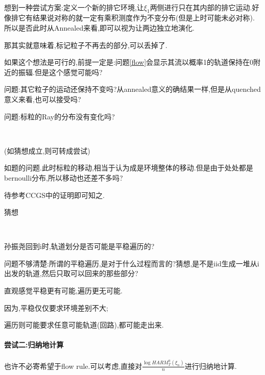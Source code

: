 \documentclass[a4paper,oneside]{ctexbook}
\begin{document}
					\begin{tri}[拆成两部分不相关的排它环境]
						\label{separate}
						\ 

						想到一种尝试方案:定义一个新的排它环境,让$\xi_1$两侧进行只在其内部的排它运动.好像排它有结果说对称的就一定有乘积测度作为不变分布(但是上时可能未必对称).所以是否此时从Annealed来看,即可以视为让两边独立地演化.

						那其实就意味着,标记粒子不再去的部分,可以丢掉了.

						如果这个想法是可行的,前提一定是:问题\ref{flow}会显示其流以概率1的轨道保持在0附近的振辐.但是这个感觉可能吗?

						问题:其它粒子的运动还保持不变吗?从annealed意义的确结果一样,但是从quenched意义来看,也可以接受吗?

						问题:标粒的Ray的分布没有变化吗?
					\end{tri}

					\begin{conjec}
						\label{free tagged}
						\ 

						(如猜想成立,则可转成尝试)

						如题的问题.此时标粒的移动,相当于认为成是环境整体的移动.但是由于处处都是bernoulli分布,所以移动也还差不多吗?

						待参考CCGS中的证明即可知之.

						猜想
					\end{conjec}

					\begin{conjec}[轨道划分的角度来看]
						\label{pathcut}
						\ 

						孙振尧回到i时,轨道划分是否可能是平稳遍历的?

						问题不够清楚:所谓的平稳遍历,是对于什么过程而言的?猜想,是不是iid生成一堆从i出发的轨道,然后只取可以回来的那些部分?

						直观感觉平稳更有可能,遍历更无可能.

						因为,平稳仅仅要求环境差别不大;

						遍历则可能要求任意可能轨道(回路),都可能走出来.

					\end{conjec}

			\paragraph*{尝试二:归纳地计算}
			\quad %

				也许不必寄希望于flow rule.可以考虑,直接对$\displaystyle\frac{\log HARM^{\eta}_T(\xi_n)}{n}$进行归纳地计算.
\end{document}

